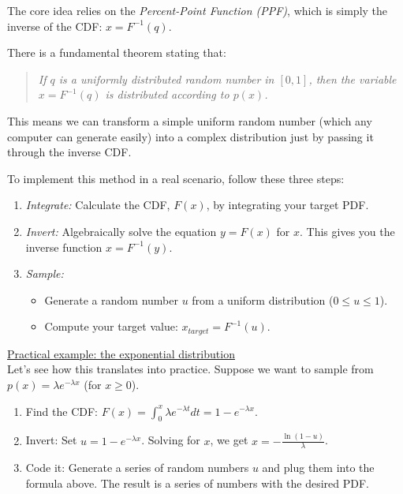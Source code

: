The core idea relies on the \textit{Percent-Point Function (PPF)}, which is simply the inverse of the CDF: $x = F^{-1}(q)$.

There is a fundamental theorem stating that:
\begin{quote}
    \textit{If $q$ is a uniformly distributed random number in $[0, 1]$, then the variable $x = F^{-1}(q)$ is distributed according to $p(x)$.}
\end{quote}

This means we can transform a simple uniform random number (which any computer can generate easily) into a complex distribution just by passing it through the inverse CDF.

To implement this method in a real scenario, follow these three steps:

\begin{enumerate}
    \item \textit{Integrate:} Calculate the CDF, $F(x)$, by integrating your target PDF.
    \item \textit{Invert:} Algebraically solve the equation $y = F(x)$ for $x$. This gives you the inverse function $x = F^{-1}(y)$.
    \item \textit{Sample:}
    \begin{itemize}
        \item[-] Generate a random number $u$ from a uniform distribution ($0 \le u \le 1$).
        \item[-] Compute your target value: $x_{target} = F^{-1}(u)$.
    \end{itemize}
\end{enumerate}

\underline{Practical example: the exponential distribution} \\
Let's see how this translates into practice. Suppose we want to sample from $p(x) = \lambda e^{-\lambda x}$ (for $x \ge 0$).
\begin{enumerate}
    \item Find the CDF: $F(x) = \int_0^x \lambda e^{-\lambda t} dt = 1 - e^{-\lambda x}$.
    \item Invert: Set $u = 1 - e^{-\lambda x}$. Solving for $x$, we get $x = -\frac{\ln(1-u)}{\lambda}$.
    \item Code it: Generate a series of random numbers $u$  and plug them into the formula above. The result is a series of numbers with the desired PDF.
\end{enumerate}


